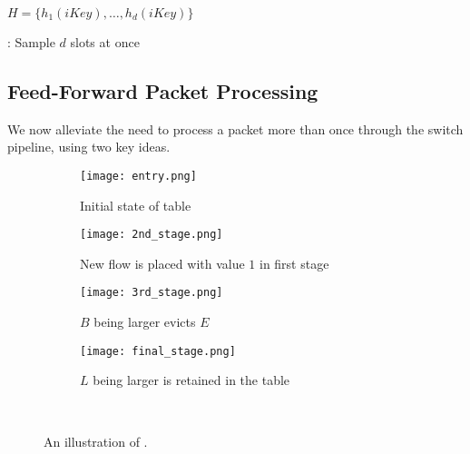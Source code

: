 \begin{algorithm}
\DontPrintSemicolon %
\;


$H = \{h_1(iKey), \ldots, h_d(iKey)\}$\;

\caption{\Baseline: Sample $d$ slots at once}
\label{algo:Baseline}
\end{algorithm}

\subsection{Feed-Forward Packet Processing}
\label{sec:feed-forward}
We now alleviate the need to process a packet more than once through the switch
pipeline, using two key ideas.

\begin{figure*}[h] 
  \begin{subfigure}[b]{0.45\linewidth}
    \centering
    \texttt{[image: entry.png]} 
    \caption{Initial state of table} 
    \label{alg:a} 
    \vspace{4ex}
  \end{subfigure}%
  \begin{subfigure}[b]{0.45\linewidth}
    \centering
    \texttt{[image: 2nd\_stage.png]} 
    \caption{New flow is placed with value $1$ in first stage}
    \label{alg:b} 
    \vspace{4ex}
  \end{subfigure} 
  \begin{subfigure}[b]{0.45\linewidth}
    \centering
    \texttt{[image: 3rd\_stage.png]} 
    \caption{$B$ being larger evicts $E$} 
    \label{alg:c} 
  \end{subfigure}%
  \begin{subfigure}[b]{0.45\linewidth}
    \centering
    \texttt{[image: final\_stage.png]} 
    \caption{$L$ being larger is retained in the table} 
    \label{alg:d} 
  \end{subfigure} 
  \\
  \vspace{0.1in}
  \caption{An illustration of \TheSystem.}
  \label{fig:HashPipe} 
\end{figure*}


